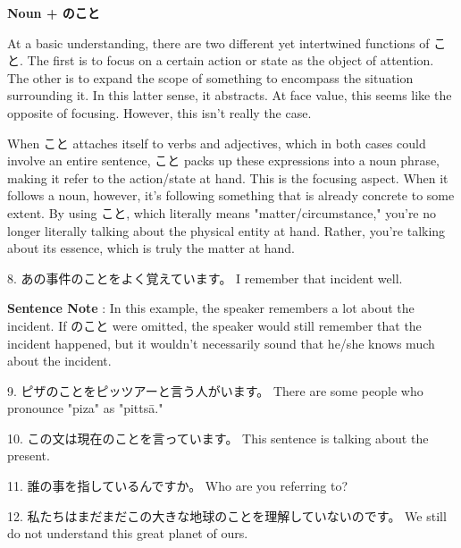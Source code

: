 \begin{center}
\textbf{Noun + のこと }  \hfill\break

\end{center}

\par{ At a basic understanding, there are two different yet intertwined functions of こと. The first is to focus on a certain action or state as the object of attention. The other is to expand the scope of something to encompass the situation surrounding it. In this latter sense, it abstracts. At face value, this seems like the opposite of focusing. However, this isn't really the case. }

\par{ When こと attaches itself to verbs and adjectives, which in both cases could involve an entire sentence, こと packs up these expressions into a noun phrase, making it refer to the action\slash state at hand. This is the focusing aspect. When it follows a noun, however, it's following something that is already concrete to some extent. By using こと, which literally means "matter\slash circumstance," you're no longer literally talking about the physical entity at hand. Rather, you're talking about its essence, which is truly the matter at hand. }

\par{8. あの事件のことをよく覚えています。 \hfill\break
I remember that incident well. }

\par{\textbf{Sentence Note }: In this example, the speaker remembers a lot about the incident. If のこと were omitted, the speaker would still remember that the incident happened, but it wouldn't necessarily sound that he\slash she knows much about the incident. }

\par{9. ピザのことをピッツアーと言う人がいます。 \hfill\break
There are some people who pronounce "piza" as "pittsā." }

\par{10. この文は現在のことを言っています。 \hfill\break
This sentence is talking about the present. }

\par{11. 誰の事を指しているんですか。 \hfill\break
Who are you referring to? }

\par{12. 私たちはまだまだこの大きな地球のことを理解していないのです。 \hfill\break
We still do not understand this great planet of ours. }

